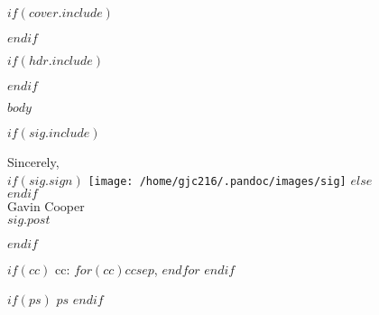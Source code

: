 \documentclass[$size$]{letter}
\newcommand{\coverpage}[0]{
	$if(cover.include)$
		
	$endif$
}
\newcommand{\header}[0]{
	$if(hdr.include)$
		
	$endif$
}
\begin{document}
\coverpage

\header

$body$

$if(sig.include)$
    \begin{minipage}[t]{6.5in}
    Sincerely,\\
    $if(sig.sign)$
        \vspace{-0.2in}\texttt{[image: /home/gjc216/.pandoc/images/sig]}
    $else$
        \\
    $endif$
    \\
    Gavin Cooper\\
    $sig.post$
    \end{minipage}
$endif$

$if(cc)$
    cc: $for(cc)$$cc$$sep$, $endfor$
$endif$

$if(ps)$
    $ps$
$endif$
\end{document}
